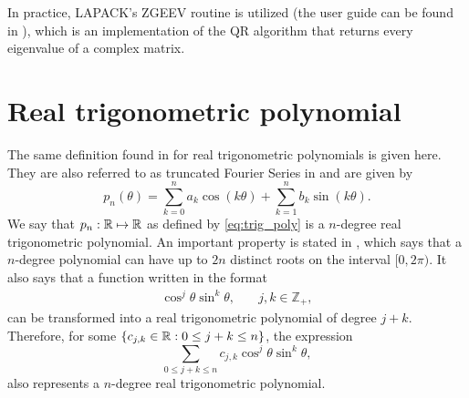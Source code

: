  In practice, LAPACK's ZGEEV routine is utilized (the user guide can be found in ), which is an implementation of the QR algorithm that returns every eigenvalue of a complex matrix.
 
\section{Real trigonometric polynomial}

The same definition found in  for real trigonometric polynomials is given here. They are also referred to as truncated Fourier Series in  and are given by
\begin{equation}\label{eq:trig_poly}
p_n(\theta) = \sum_{k=0}^{n} a_k\cos(k\theta) + \sum_{k=1}^{n} b_k\sin(k\theta).
\end{equation}
We say that $p_n: \mathbb{R} \mapsto \mathbb{R}$ as defined by \autoref{eq:trig_poly} is a $n$-degree real trigonometric polynomial. An important property is stated in , which says that a $n$-degree polynomial can have up to $2n$ distinct roots on the interval $[0, 2\pi)$. It also says that a function written in the format
$$\begin{array}{cc}\cos^j{\theta}\sin^k{\theta}, & \quad j, k \in \mathbb{Z}_+, \end{array}$$
can be transformed into a real trigonometric polynomial of degree $j+k$. Therefore, for some $\{c_{j,k} \in \mathbb{R}: 0 \le j+k \le n\}$, the expression
\begin{equation}\label{eq:trig_poly_2}
\sum_{0 \le j+k \le n}c_{j,k}\cos^j{\theta}\sin^k{\theta},
\end{equation}
also represents a $n$-degree real trigonometric polynomial.